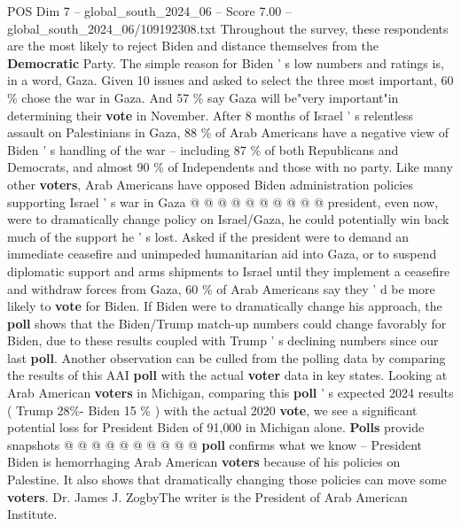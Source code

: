 \begin{textsample}{POS Dim 7 – global\_south\_2024\_06 – Score 7.00 – global\_south\_2024\_06/109192308.txt}
Throughout the survey, these respondents are the most likely to reject Biden and distance themselves from the \textbf{Democratic} Party.
The simple reason for Biden ' s low numbers and ratings is, in a word, Gaza.
Given 10 issues and asked to select the three most important, 60 \% chose the war in Gaza.
And 57 \% say Gaza will be"very important"in determining their \textbf{vote} in November.
After 8 months of Israel ' s relentless assault on Palestinians in Gaza, 88 \% of Arab Americans have a negative view of Biden ' s handling of the war -- including 87 \% of both Republicans and Democrats, and almost 90 \% of Independents and those with no party.
Like many other \textbf{voters}, Arab Americans have opposed Biden administration policies supporting Israel ' s war in Gaza @ @ @ @ @ @ @ @ @ @ president, even now, were to dramatically change policy on Israel/Gaza, he could potentially win back much of the support he ' s lost.
Asked if the president were to demand an immediate ceasefire and unimpeded humanitarian aid into Gaza, or to suspend diplomatic support and arms shipments to Israel until they implement a ceasefire and withdraw forces from Gaza, 60 \% of Arab Americans say they ' d be more likely to \textbf{vote} for Biden.
If Biden were to dramatically change his approach, the \textbf{poll} shows that the Biden/Trump match-up numbers could change favorably for Biden, due to these results coupled with Trump ' s declining numbers since our last \textbf{poll}.
Another observation can be culled from the polling data by comparing the results of this AAI \textbf{poll} with the actual \textbf{voter} data in key states.
Looking at Arab American \textbf{voters} in Michigan, comparing this \textbf{poll} ' s expected 2024 results ( Trump 28\%- Biden 15 \% ) with the actual 2020 \textbf{vote}, we see a significant potential loss for President Biden of 91,000 in Michigan alone. \textbf{Polls} provide snapshots @ @ @ @ @ @ @ @ @ @ \textbf{poll} confirms what we know -- President Biden is hemorrhaging Arab American \textbf{voters} because of his policies on Palestine.
It also shows that dramatically changing those policies can move some \textbf{voters}.
Dr.
James J.
ZogbyThe writer is the President of Arab American Institute.

\end{textsample}
